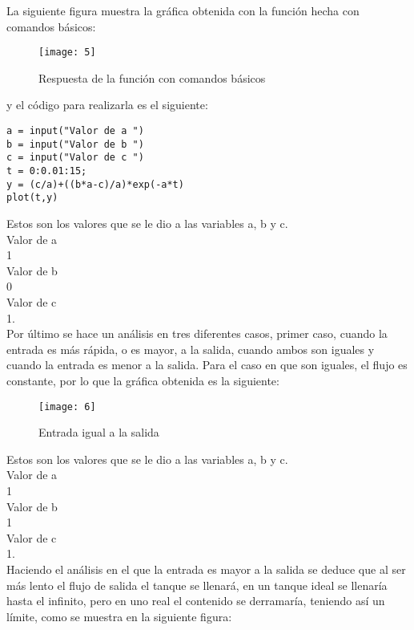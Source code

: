 \documentclass[12pt]{article}
\begin{document}
	La siguiente figura muestra la gráfica obtenida con la función hecha con comandos básicos:\\
	
		\begin{figure}[h]
		\centering
		\texttt{[image: 5]}
		\caption{Respuesta de la función con comandos básicos}\label{figura 4}
	\end{figure}

y el código para realizarla es el siguiente:
\begin{lstlisting}[frame=single]
a = input("Valor de a ")
b = input("Valor de b ")
c = input("Valor de c ")
t = 0:0.01:15;
y = (c/a)+((b*a-c)/a)*exp(-a*t)
plot(t,y)
\end{lstlisting}

Estos son los valores que se le dio a las variables a, b y c.\\
Valor de a \\
1\\
Valor de b\\ 
0\\
Valor de c\\ 
1.\\

Por último se hace un análisis en tres diferentes casos, primer caso, cuando la entrada es más rápida, o es mayor, a la salida, cuando ambos son iguales y cuando la entrada es menor a la salida.
Para el caso en que son iguales, el flujo es constante, por lo que la gráfica obtenida es la siguiente:\\

\begin{figure}[h]
	\centering
	\texttt{[image: 6]}
	\caption{Entrada igual a la salida}\label{figura 5}
\end{figure}
	
	Estos son los valores que se le dio a las variables a, b y c.\\
	Valor de a \\
	1\\
	Valor de b\\ 
	1\\
	Valor de c\\ 
	1.\\

Haciendo el análisis en el que la entrada es mayor a la salida se deduce que al ser más lento el flujo de salida el tanque se llenará, en un tanque ideal se llenaría hasta el infinito, pero en uno real el contenido se derramaría, teniendo así un límite, como se muestra en la siguiente figura:
\end{document}
